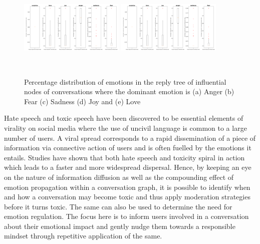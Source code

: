 \documentclass[acmtog]{acmart}
\begin{document}
\begin{figure}[h]
\begin{minipage}{.33\textwidth}
  \end{minipage}
 \medskip
  \begin{minipage}{.33\textwidth}
    \centering
    \includegraphics[width=5cm,height=5cm,keepaspectratio]{anger.png}
  \end{minipage}%
  \begin{minipage}{.33\textwidth}
    \centering
    \includegraphics[width=5cm,height=5cm,keepaspectratio]{anger.png}
  \end{minipage}
  
  \caption{Percentage distribution of emotions in the reply tree of influential nodes of conversations where the dominant emotion is (a) Anger (b) Fear (c) Sadness (d) Joy and (e) Love}
  \label{SampleConv}
  \end{figure}
Hate speech and toxic speech have been discovered to be essential elements of virality on social media where the use of uncivil language is common to a large number of users. A viral spread corresponds to a rapid dissemination of a piece of information via connective action of users and is often fuelled by the emotions it entails. Studies have shown that both hate speech and toxicity spiral in action which leads to a faster and more widespread dispersal. Hence, by keeping an eye on the nature of information diffusion as well as the compounding effect of emotion propagation within a conversation graph, it is possible to identify when and how a conversation may become toxic and thus apply moderation strategies before it turns toxic. The same can also be used to determine the need for emotion regulation. The focus here is to inform users involved in a conversation about their emotional impact and gently nudge them towards a responsible mindset through repetitive application of the same. 
\end{document}
